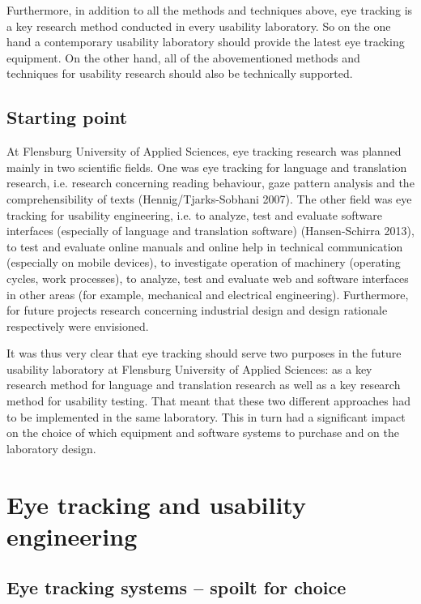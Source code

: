 \documentclass[output=paper]{langsci/langscibook}
\begin{document}
Furthermore, in addition to all the methods and techniques above, eye tracking is a key research method conducted in every usability laboratory. So on the one hand a contemporary usability laboratory should provide the latest eye tracking equipment. On the other hand, all of the abovementioned methods and techniques for usability research should also be technically supported.

\subsection{Starting point}

At Flensburg University of Applied Sciences, eye tracking research was planned mainly in two scientific fields. One was eye tracking for language and translation research, i.e. research concerning reading behaviour, gaze pattern analysis and the comprehensibility of texts (Hennig/Tjarks-Sobhani 2007). The other field was eye tracking for usability engineering, i.e. to analyze, test and evaluate software interfaces (especially of language and translation software) (Hansen-Schirra 2013), to test and evaluate online manuals and online help in technical communication (especially on mobile devices), to investigate operation of machinery (operating cycles, work processes), to analyze, test and evaluate web and software interfaces in other areas (for example, mechanical and electrical engineering). Furthermore, for future projects research concerning industrial design and design rationale respectively were envisioned.


It was thus very clear that eye tracking should serve two purposes in the future usability laboratory at Flensburg University of Applied Sciences: as a key research method for language and translation research as well as a key research method for usability testing. That meant that these two different approaches had to be implemented in the same laboratory. This in turn had a significant impact on the choice of which equipment and software systems to purchase and on the laboratory design.


\section{Eye tracking and usability engineering }

\subsection{Eye tracking systems – spoilt for choice }
\end{document}
